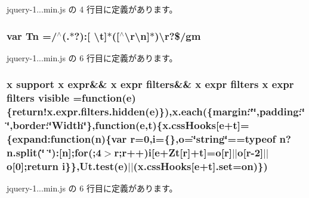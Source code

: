  jquery-\/1...\+min.\+js の 4 行目に定義があります。

\hypertarget{jquery-1_810_82_8min_8js_a2a743fa90b7bc233019c5b720ccde5cc}{}
\subsubsection[{Tn}]{\setlength{\rightskip}{0pt plus 5cm}var Tn =/$^\wedge$(.$\ast$?)\+:\mbox{[} \textbackslash{}{\bf t}\mbox{]}$\ast$(\mbox{[}$^\wedge$\textbackslash{}r\textbackslash{}n\mbox{]}$\ast$)\textbackslash{}r?\$/gm}\label{jquery-1_810_82_8min_8js_a2a743fa90b7bc233019c5b720ccde5cc}


 jquery-\/1...\+min.\+js の 6 行目に定義があります。

\hypertarget{jquery-1_810_82_8min_8js_a52992524aa1f4d01d5c9f1b9a15c35f5}{}
\subsubsection[{visible}]{ {\bf x} support {\bf x} expr\&\& {\bf x} expr filters\&\& {\bf x} expr filters {\bf x} expr filters visible =function({\bf e})\{{\bf return!x.\+expr.\+filters.\+hidden}({\bf e})\}),{\bf x.\+each}(\{margin\+:\char`\"{}\char`\"{},padding\+:\char`\"{}\char`\"{},border\+:\char`\"{}Width\char`\"{}\},function({\bf e},{\bf t})\{x.\+css\+Hooks\mbox{[}{\bf e}+{\bf t}\mbox{]}=\{expand\+:function(n)\{var r=0,i=\{\},{\bf o}=\char`\"{}string\char`\"{}==typeof n?n.\+split(\char`\"{} \char`\"{})\+:\mbox{[}n\mbox{]};{\bf for}(;4$>$r;r++)i\mbox{[}{\bf e}+Zt\mbox{[}r\mbox{]}+{\bf t}\mbox{]}={\bf o}\mbox{[}r\mbox{]}$\vert$$\vert${\bf o}\mbox{[}r-\/2\mbox{]}$\vert$$\vert${\bf o}\mbox{[}0\mbox{]};return i\}\},Ut.\+test({\bf e})$\vert$$\vert$(x.\+css\+Hooks\mbox{[}{\bf e}+{\bf t}\mbox{]}.set={\bf on})\})}\label{jquery-1_810_82_8min_8js_a52992524aa1f4d01d5c9f1b9a15c35f5}


 jquery-\/1...\+min.\+js の 6 行目に定義があります。

\hypertarget{jquery-1_810_82_8min_8js_a4d3ea42bab8c1a36105c29b5a098a050}{}

